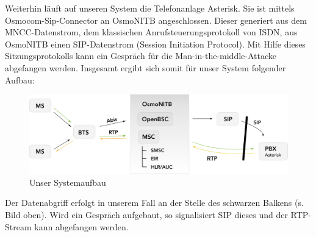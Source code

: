 Weiterhin läuft auf unseren System die Telefonanlage Asterisk. Sie ist mittels Osmocom-Sip-Connector an OsmoNITB angeschlossen. Dieser generiert aus dem MNCC-Datenstrom, dem klassischen Anrufsteuerungsprotokoll von ISDN, aus OsmoNITB einen SIP-Datenstrom (Session Initiation Protocol). Mit Hilfe dieses Sitzungsprotokolls kann ein Gespräch für die Man-in-the-middle-Attacke abgefangen werden. Insgesamt ergibt sich somit für unser System folgender Aufbau:



\begin{figure}[h]
    \centering
    \includegraphics[width=14cm]{includes/aufbau_osmonitb}
    \caption{Unser Systemaufbau}
	\label{fig:osmonitb3}
\end{figure}


Der Datenabgriff erfolgt in unserem Fall an der Stelle des schwarzen Balkens (s. Bild oben). Wird ein Gespräch aufgebaut, so signalisiert SIP dieses und der RTP-Stream kann abgefangen werden.
